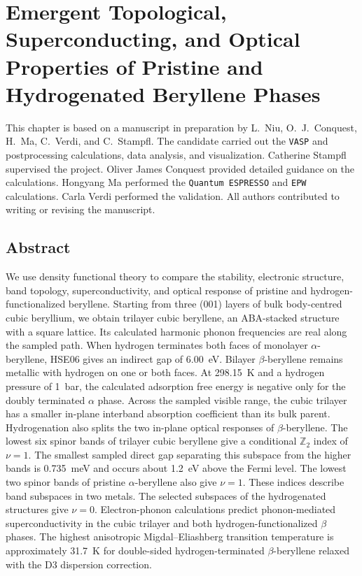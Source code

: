 \chapter[Properties of Pristine and Hydrogenated Beryllene]{Emergent Topological, Superconducting, and Optical Properties of Pristine and Hydrogenated Beryllene Phases}
\label{cha:project_beryllene}

This chapter is based on a manuscript in preparation by L.~Niu, O.~J.~Conquest, H.~Ma, C.~Verdi, and C.~Stampfl.
The candidate carried out the \texttt{VASP} and postprocessing calculations, data analysis, and visualization.
Catherine Stampfl supervised the project.
Oliver James Conquest provided detailed guidance on the calculations.
Hongyang Ma performed the \texttt{Quantum ESPRESSO} and \texttt{EPW} calculations.
Carla Verdi performed the validation.
All authors contributed to writing or revising the manuscript.

\FloatBarrier
\section{Abstract}
\label{3_abstract}

We use density functional theory to compare the stability, electronic structure, band topology, superconductivity, and optical response of pristine and hydrogen-functionalized beryllene.
Starting from three (001) layers of bulk body-centred cubic beryllium, we obtain trilayer cubic beryllene, an ABA-stacked structure with a square lattice.
Its calculated harmonic phonon frequencies are real along the sampled path.
When hydrogen terminates both faces of monolayer $\alpha$-beryllene, HSE06 gives an indirect gap of \qty{6.00}{\electronvolt}.
Bilayer $\beta$-beryllene remains metallic with hydrogen on one or both faces.
At \qty{298.15}{\kelvin} and a hydrogen pressure of \qty{1}{\bar}, the calculated adsorption free energy is negative only for the doubly terminated $\alpha$ phase.
Across the sampled visible range, the cubic trilayer has a smaller in-plane interband absorption coefficient than its bulk parent.
Hydrogenation also splits the two in-plane optical responses of $\beta$-beryllene.
The lowest six spinor bands of trilayer cubic beryllene give a conditional $\mathbb{Z}_2$ index of $\nu=1$.
The smallest sampled direct gap separating this subspace from the higher bands is \qty{0.735}{\milli\electronvolt} and occurs about \qty{1.2}{\electronvolt} above the Fermi level.
The lowest two spinor bands of pristine $\alpha$-beryllene also give $\nu=1$.
These indices describe band subspaces in two metals.
The selected subspaces of the hydrogenated structures give $\nu=0$.
Electron-phonon calculations predict phonon-mediated superconductivity in the cubic trilayer and both hydrogen-functionalized $\beta$ phases.
The highest anisotropic Migdal--Eliashberg transition temperature is approximately \qty{31.7}{\kelvin} for double-sided hydrogen-terminated $\beta$-beryllene relaxed with the D3 dispersion correction.

